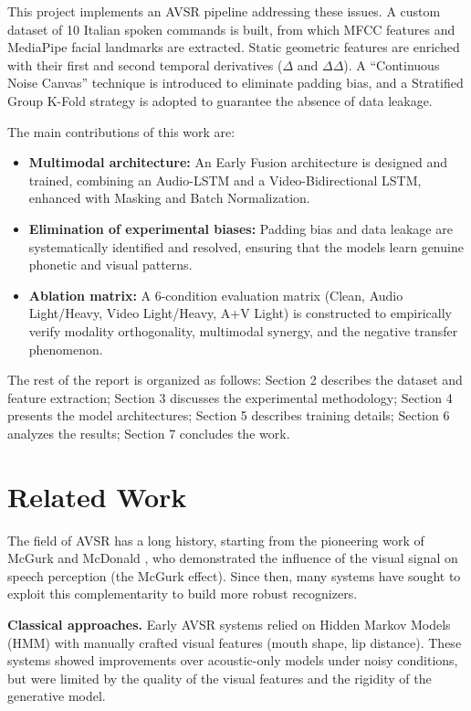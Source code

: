 \documentclass[sigconf,screen,nonacm]{acmart}
\begin{document}
This project implements an AVSR pipeline addressing these issues. A custom dataset of 10 Italian spoken commands is built, from which MFCC features and MediaPipe facial landmarks are extracted. Static geometric features are enriched with their first and second temporal derivatives ($\Delta$ and $\Delta\Delta$). A ``Continuous Noise Canvas'' technique is introduced to eliminate padding bias, and a Stratified Group K-Fold strategy is adopted to guarantee the absence of data leakage.

The main contributions of this work are:
\begin{itemize}
  \item \textbf{Multimodal architecture:} An Early Fusion architecture is designed and trained, combining an Audio-LSTM and a Video-Bidirectional LSTM, enhanced with Masking and Batch Normalization.
  \item \textbf{Elimination of experimental biases:} Padding bias and data leakage are systematically identified and resolved, ensuring that the models learn genuine phonetic and visual patterns.
  \item \textbf{Ablation matrix:} A 6-condition evaluation matrix (Clean, Audio Light/Heavy, Video Light/Heavy, A+V Light) is constructed to empirically verify modality orthogonality, multimodal synergy, and the negative transfer phenomenon.
\end{itemize}

The rest of the report is organized as follows: Section 2 describes the dataset and feature extraction; Section 3 discusses the experimental methodology; Section 4 presents the model architectures; Section 5 describes training details; Section 6 analyzes the results; Section 7 concludes the work.

\section{Related Work}

The field of AVSR has a long history, starting from the pioneering work of McGurk and McDonald \cite{mcgurk1976}, who demonstrated the influence of the visual signal on speech perception (the McGurk effect). Since then, many systems have sought to exploit this complementarity to build more robust recognizers.

\textbf{Classical approaches.} Early AVSR systems relied on Hidden Markov Models (HMM) with manually crafted visual features (mouth shape, lip distance). These systems showed improvements over acoustic-only models under noisy conditions, but were limited by the quality of the visual features and the rigidity of the generative model.
\end{document}
